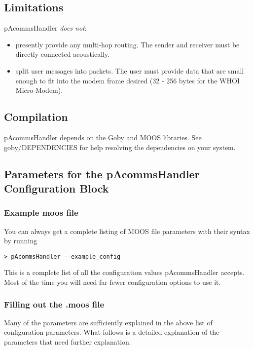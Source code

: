 \subsection{Limitations}
pAcommsHandler \textit{does not}:

\begin{itemize}
\item presently provide any multi-hop routing. The sender and receiver must be directly connected acoustically.
\item split user messages into packets. The user must provide data that are small enough to fit into the modem frame desired (32 - 256 bytes for the WHOI Micro-Modem).
\end{itemize} 

\subsection{Compilation}
pAcommsHandler depends on the Goby and MOOS libraries. See goby/DEPENDENCIES for help resolving the dependencies on your system.

\subsection{Parameters for the pAcommsHandler Configuration Block}\label{sec:pAcommsHandler:config}

\subsubsection{Example moos file}

You can always get a complete listing of MOOS file parameters with their syntax by running
\begin{verbatim}
> pAcommsHandler --example_config
\end{verbatim}
\resetbvlinenumber

This is a complete list of all the configuration values pAcommsHandler accepts. Most of the time you will need far fewer configuration options to use it.

\resetbvlinenumber

\subsubsection{Filling out the .moos file}\label{sec:pAcommsHandler_moos_file}

Many of the parameters are sufficiently explained in the above list of configuration parameters. What follows is a detailed explanation of the parameters that need further explanation.

